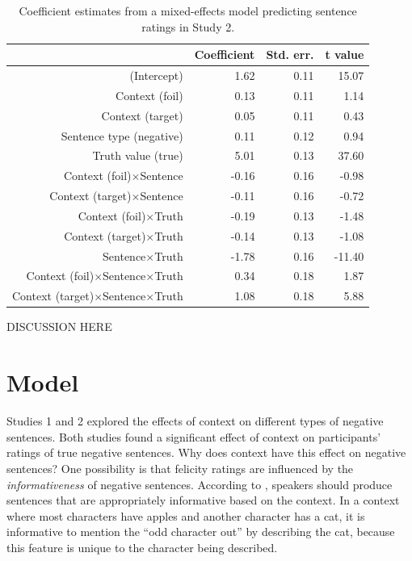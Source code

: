 \documentclass[10pt,letterpaper]{article}
\begin{document}
\begin{table}[t]
\caption{\label{tab:s2} Coefficient estimates from a mixed-effects model predicting sentence ratings in Study 2.}
\begin{center}
\small\addtolength{\tabcolsep}{-5pt}
\begin{tabular}{rrrr}
  \hline
 & Coefficient & Std. err. & t value \\ 
  \hline
(Intercept) & 1.62 & 0.11 & 15.07 \\ 
  Context (foil) & 0.13 & 0.11 & 1.14  \\ 
  Context (target) & 0.05 & 0.11 & 0.43  \\ 
  Sentence type (negative) & 0.11 & 0.12 & 0.94 \\
  Truth value (true) & 5.01 & 0.13 & 37.60 \\ 
  Context (foil)$\times$Sentence & -0.16 & 0.16 & -0.98 \\
  Context (target)$\times$Sentence & -0.11 & 0.16 & -0.72 \\
  Context (foil)$\times$Truth & -0.19 & 0.13 & -1.48 \\
  Context (target)$\times$Truth & -0.14 & 0.13 & -1.08 \\
  Sentence$\times$Truth & -1.78 & 0.16 & -11.40 \\
  Context (foil)$\times$Sentence$\times$Truth& 0.34 & 0.18 & 1.87 \\
  Context (target)$\times$Sentence$\times$Truth & 1.08 & 0.18 & 5.88 \\
   \hline
\end{tabular}
\vspace{-1.5cm}
\end{center}
\end{table}

DISCUSSION HERE


\section{Model}

Studies 1 and 2 explored the effects of context on different types of negative sentences.  Both studies found a significant effect of context on participants' ratings of true negative sentences.  Why does context have this effect on negative sentences?  One possibility is that felicity ratings are influenced by the \emph{informativeness} of negative sentences.  According to , speakers should produce sentences that are appropriately informative based on the context.  In a context where most characters have apples and another character has a cat, it is informative to mention the ``odd character out'' by describing the cat, because this feature is unique to the character being described.
\end{document}
